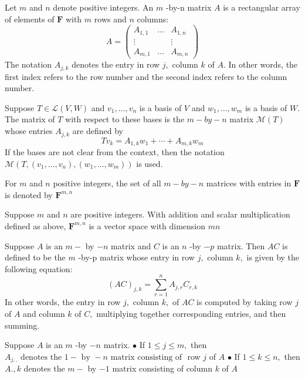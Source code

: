 
Let $m$ and $n$ denote positive integers. An $m$ -by-n matrix $A$ is a rectangular array of elements of $\mathbf{F}$ with $m$ rows and $n$ columns:
$$
A=\left(\begin{array}{ccc}
{A_{1,1}} & {\dots} & {A_{1, n}} \\
{\vdots} & {} & {\vdots} \\
{A_{m, 1}} & {\dots} & {A_{m, n}}
\end{array}\right)
$$
The notation $A_{j, k}$ denotes the entry in row $j,$ column $k$ of $A .$ In other words, the first index refers to the row number and the second index refers to the column number.

Suppose $T \in \mathcal{L}(V, W)$ and $v_{1}, \ldots, v_{n}$ is a basis of $V$ and $w_{1}, \ldots, w_{m}$ is a basis of $W .$ The matrix of $T$ with respect to these bases is the $m-b y-n$ matrix $\mathcal{M}(T)$ whose entries $A_{j, k}$ are defined by
$$
T v_{k}=A_{1, k} w_{1}+\cdots+A_{m, k} w_{m}
$$
If the bases are not clear from the context, then the notation $\mathcal{M}\left(T,\left(v_{1}, \ldots, v_{n}\right),\left(w_{1}, \ldots, w_{m}\right)\right)$ is used.

For $m$ and $n$ positive integers, the set of all $m-b y-n$ matrices with entries in $\mathbf{F}$ is denoted by $\mathbf{F}^{m, n}$

Suppose $m$ and $n$ are positive integers. With addition and scalar multiplication defined as above, $\mathbf{F}^{m, n}$ is a vector space with dimension $m n$

Suppose $A$ is an $m-$ by $-n$ matrix and $C$ is an $n$ -by $-p$ matrix. Then $A C$ is defined to be the $m$ -by-p matrix whose entry in row $j,$ column $k,$ is given by the following equation:
$$
(A C)_{j, k}=\sum_{r=1}^{n} A_{j, r} C_{r, k}
$$
In other words, the entry in row $j,$ column $k,$ of $A C$ is computed by taking row $j$ of $A$ and column $k$ of $C,$ multiplying together corresponding entries, and then summing.

Suppose $A$ is an $m$ -by $-n$ matrix.
$\bullet$ If $1 \leq j \leq m,$ then $A_{j,.} \text { denotes the } 1-\text { by }-n \text { matrix consisting of }$ row $j$ of $A$
$\bullet$ If $1 \leq k \leq n,$ then $A., k$ denotes the $m-$ by $-1$ matrix consisting of column $k$ of $A$

